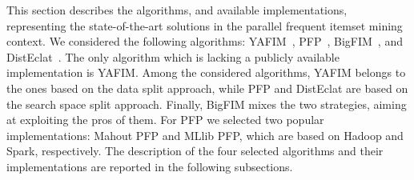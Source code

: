 This section describes the algorithms, and available implementations, representing the state-of-the-art
solutions in the parallel frequent itemset mining context. We considered the following algorithms: YAFIM~\cite{YAFIM},
PFP~\cite{pfpgrowth},
BigFIM~\cite{bigfim}, and DistEclat~\cite{bigfim}.
The only algorithm which is lacking a publicly available implementation is YAFIM.
Among the considered algorithms, YAFIM belongs to the ones based on the data split approach, 
while PFP and DistEclat are based on the search space split approach. Finally, BigFIM mixes the two strategies, aiming at exploiting the pros of them.
For PFP we selected two popular implementations: Mahout PFP and MLlib PFP, which are based on Hadoop and Spark, respectively.  
The description of the four selected algorithms and their implementations are reported in the following subsections.



